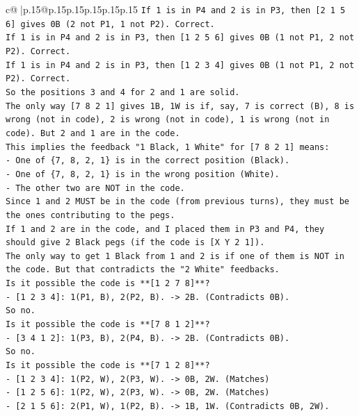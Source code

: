 \documentclass{article}
\begin{document}
{\begin{supertabular}{c@{$\;$}|p{.15\linewidth}@{}p{.15\linewidth}p{.15\linewidth}p{.15\linewidth}p{.15\linewidth}p{.15\linewidth}}
{{{\texttt{If 1 is in P4 and 2 is in P3, then {[}2 1 5 6{]} gives 0B (2 not P1, 1 not P2). Correct.} \\
\texttt{If 1 is in P4 and 2 is in P3, then {[}1 2 5 6{]} gives 0B (1 not P1, 2 not P2). Correct.} \\
\texttt{If 1 is in P4 and 2 is in P3, then {[}1 2 3 4{]} gives 0B (1 not P1, 2 not P2). Correct.} \\
\texttt{So the positions 3 and 4 for 2 and 1 are solid.} \\
\texttt{The only way {[}7 8 2 1{]} gives 1B, 1W is if, say, 7 is correct (B), 8 is wrong (not in code), 2 is wrong (not in code), 1 is wrong (not in code). But 2 and 1 are in the code.} \\
\texttt{This implies the feedback "1 Black, 1 White" for {[}7 8 2 1{]} means:} \\
\texttt{{-} One of \{7, 8, 2, 1\} is in the correct position (Black).} \\
\texttt{{-} One of \{7, 8, 2, 1\} is in the wrong position (White).} \\
\texttt{{-} The other two are NOT in the code.} \\
\texttt{Since 1 and 2 MUST be in the code (from previous turns), they must be the ones contributing to the pegs.} \\
\texttt{If 1 and 2 are in the code, and I placed them in P3 and P4, they should give 2 Black pegs (if the code is {[}X Y 2 1{]}).} \\
\texttt{The only way to get 1 Black from 1 and 2 is if one of them is NOT in the code. But that contradicts the "2 White" feedbacks.} \\
\texttt{Is it possible the code is **{[}1 2 7 8{]}**?} \\
\texttt{{-} {[}1 2 3 4{]}: 1(P1, B), 2(P2, B). {-}> 2B. (Contradicts 0B).} \\
\texttt{So no.} \\
\texttt{Is it possible the code is **{[}7 8 1 2{]}**?} \\
\texttt{{-} {[}3 4 1 2{]}: 1(P3, B), 2(P4, B). {-}> 2B. (Contradicts 0B).} \\
\texttt{So no.} \\
\texttt{Is it possible the code is **{[}7 1 2 8{]}**?} \\
\texttt{{-} {[}1 2 3 4{]}: 1(P2, W), 2(P3, W). {-}> 0B, 2W. (Matches)} \\
\texttt{{-} {[}1 2 5 6{]}: 1(P2, W), 2(P3, W). {-}> 0B, 2W. (Matches)} \\
\texttt{{-} {[}2 1 5 6{]}: 2(P1, W), 1(P2, B). {-}> 1B, 1W. (Contradicts 0B, 2W).} \\
}}}
\end{supertabular}}
\end{document}
